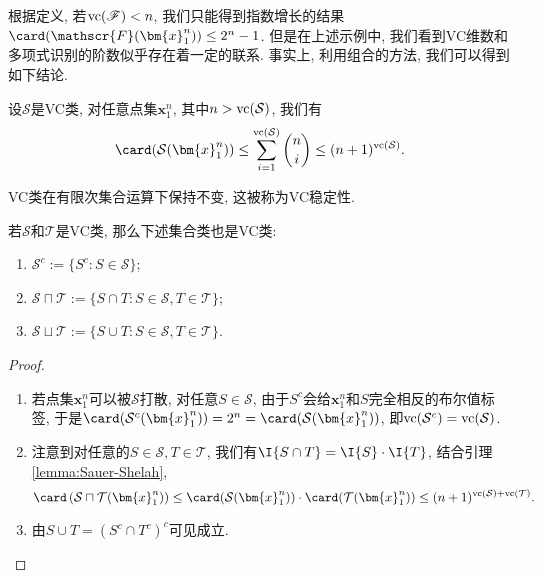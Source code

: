 根据定义, 若$\mathrm{vc}(\mathscr{F}) < n$, 我们只能得到指数增长的结果$\card(\mathscr{F}(\bm{x}_1^n)) \leq 2^n - 1$.
但是在上述示例中, 我们看到VC维数和多项式识别的阶数似乎存在着一定的联系.
事实上, 利用组合的方法, 我们可以得到如下结论. 
\begin{lemma}\label{lemma:Sauer-Shelah}
	设$\mathcal{S}$是VC类, 对任意点集$\bm{x}_1^n$, 其中$n > \mathrm{vc}(\mathcal{S})$, 我们有
	\begin{equation*}
		\card(\mathcal{S}(\bm{x}_1^n))
		\leq \sum_{i=1}^{\vc(\mathcal{S})} \binom ni
		\leq (n+1)^{\vc(\mathcal{S})}. 
	\end{equation*}
\end{lemma}

VC类在有限次集合运算下保持不变, 这被称为VC稳定性. 
\begin{proposition}[VC稳定性]
	若$\mathcal{S}$和$\mathcal{T}$是VC类, 那么下述集合类也是VC类: 
	\begin{enumerate}[label=(\alph*)]
		\item $\mathcal{S}^c := \{S^c \colon S \in \mathcal{S}\}$;
		\item $\mathcal{S} \sqcap \mathcal{T} := \{S \cap T \colon S \in \mathcal{S}, T \in \mathcal{T}\}$;
		\item $\mathcal{S} \sqcup \mathcal{T} := \{S \cup T \colon S \in \mathcal{S}, T \in \mathcal{T}\}$.
	\end{enumerate}
\end{proposition}
\begin{proof}
	\begin{enumerate}[label=(\alph*)]
		\item 若点集$\bm{x}_1^n$可以被$\mathcal{S}$打散, 对任意$S \in \mathcal{S}$, 由于$S^c$会给$\bm{x}_1^n$和$S$完全相反的布尔值标签, 于是$\card(\mathcal{S}^c(\bm{x}_1^n)) = 2^n = \card(\mathcal{S}(\bm{x}_1^n))$, 即$\mathrm{vc}(\mathcal{S}^c) = \mathrm{vc}(\mathcal{S})$. 
		\item 注意到对任意的$S \in \mathcal{S}, T \in \mathcal{T}$, 我们有$\I{S \cap T} = \I{S} \cdot \I{T}$, 结合引理\ref{lemma:Sauer-Shelah}, 
			\begin{equation*}
				\card\left( \mathcal{S} \sqcap \mathcal{T} (\bm{x}_1^n) \right) 
				\leq \card(\mathcal{S}(\bm{x}_1^n)) \cdot \card(\mathcal{T}(\bm{x}_1^n))
				\leq (n+1)^{\vc(\mathcal{S}) + \vc(\mathcal{T})}. 
			\end{equation*}
		\item 由$S \cup T = (S^c \cap T^c)^c$可见成立. 
	\end{enumerate}
\end{proof}

